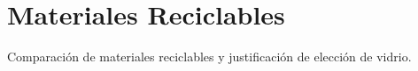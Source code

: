 \chapter{Materiales Reciclables}
\label{cp:recycling-materials}

\parindent0pt

Comparación de materiales reciclables y justificación de elección de vidrio.

